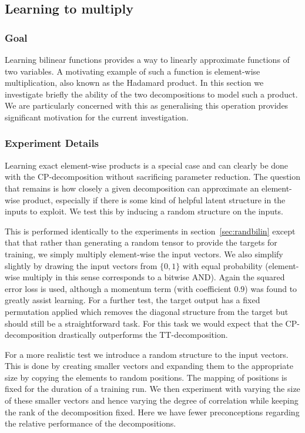 \subsection{Learning to multiply}
\subsubsection{Goal}
Learning bilinear functions provides a way to linearly approximate functions of two variables.
A motivating example of such a function is element-wise multiplication, also known as the Hadamard
product. In this section we investigate briefly the ability of the two decompositions to model
such a product. We are particularly concerned with this as generalising this operation provides
significant motivation for the current investigation.


\subsubsection{Experiment Details}
Learning exact element-wise products is a special case and can clearly be done with the 
CP-decomposition without sacrificing parameter reduction. The question that remains is how closely
a given decomposition can approximate an element-wise product, especially if there is some kind of
helpful latent structure in the inputs to exploit. We test this by inducing a random structure
on the inputs.

This is performed identically to the experiments in section~\ref{sec:randbilin}
except that that rather than generating a random tensor to provide the targets for training,
we simply multiply element-wise the input vectors. We also simplify slightly by drawing the
input vectors from \(\{0,1\}\) with equal probability
(element-wise multiply in this sense corresponds to a bitwise AND). 
Again the squared error loss is used, although
a momentum term (with coefficient 0.9) was found to greatly assist learning.
For a further test, the target
output has a fixed permutation applied which removes the diagonal structure from the target but
should still be a straightforward task. For this task we would
expect that the CP-decomposition drastically outperforms the TT-decomposition.

For a more realistic test we introduce a random structure to the input vectors. This is done by
creating smaller vectors and expanding them to the appropriate size by copying the
elements to random positions. The mapping of positions is fixed for the duration of a training
run. We then experiment with varying the size of these smaller vectors and hence varying the
degree of correlation while keeping the rank of the decomposition fixed. Here we have fewer
preconceptions regarding the relative performance of the decompositions.

